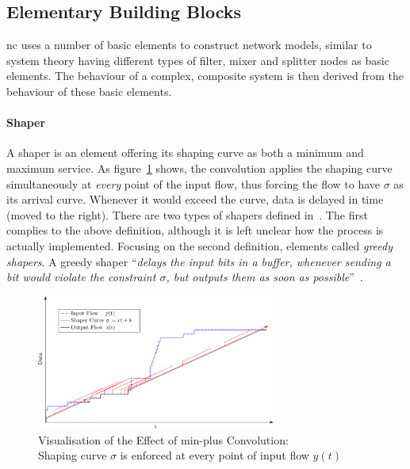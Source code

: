 \subsection{Elementary Building Blocks}
\label{ssec:nc_elementary}
\gls{nc} uses a number of basic elements to construct network models, similar to system theory having different types of filter, mixer and splitter nodes
as basic elements. The behaviour of a complex, composite system is then derived from the behaviour of these basic elements.
\paragraph{Shaper}
A shaper is an element offering its shaping curve as both a minimum and maximum service.
As figure~\ref{fig:nc_basics2} shows, the convolution applies the shaping curve simultaneously at
\emph{every} point of the input flow,  thus forcing the flow to have $\sigma$ as its arrival curve. Whenever it would exceed the curve, data is delayed in time (moved to the right).
There are two types of shapers defined in~\cite{thiran_network_2001}. 
The first complies to the above definition, although it is left unclear how the process is actually implemented. 
Focusing on the second definition, elements called \emph{greedy shapers}. A greedy shaper \enquote{\textit{delays the input bits in a buffer, whenever sending a bit would violate the constraint $\sigma$, but outputs them as
soon as possible}}~\cite[p. 42]{thiran_network_2001}.
%
\begin{figure}[H]
  \centering
  \includegraphics*[width=0.7\textwidth,height=\textheight,keepaspectratio]{Figures/nc_basics2}
  \caption{Visualisation of the Effect of min-plus Convolution:\\Shaping curve $\sigma$ is enforced at every point of input flow $y(t)$}
  \label{fig:nc_basics2}
\end{figure}
%
